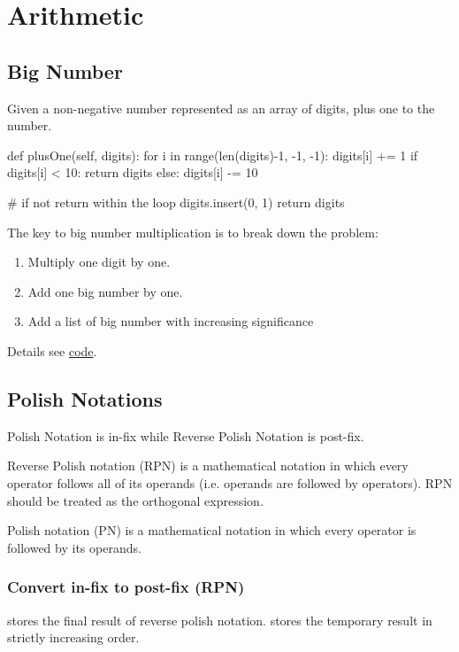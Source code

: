 \chapter{Arithmetic}


\section{Big Number}
 Given a non-negative number represented as an array of digits, plus one to the number.
\begin{python}
def plusOne(self, digits):
    for i in range(len(digits)-1, -1, -1):
        digits[i] += 1
        if digits[i] < 10:
            return digits
        else:
            digits[i] -= 10

    # if not return within the loop 
    digits.insert(0, 1)
    return digits
\end{python}

 The key to big number multiplication is to break down the problem:
\begin{enumerate}
\item Multiply one digit by one.
\item Add one big number by one.
\item Add a list of big number with increasing significance
\end{enumerate}
Details see \href{https://github.com/algorhythms/LeetCode/blob/master/042%20Multiply%20Strings.py}{code}.

\section{Polish Notations}
Polish Notation is in-fix while Reverse Polish Notation is post-fix. 

Reverse Polish notation (RPN) is a mathematical notation in which every operator follows all of its operands (i.e. operands are followed by operators). RPN should be treated as the orthogonal expression.  

Polish notation (PN) is a mathematical notation in which every operator is followed by its operands. 

\subsection{Convert in-fix to post-fix (RPN)}
 stores the final result of reverse polish notation.  stores
the temporary result in strictly increasing order. 

